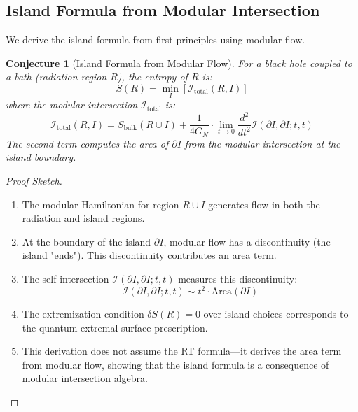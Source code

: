 \documentclass[12pt,a4paper]{article}
\newtheorem{conjecture}[theorem]{Conjecture}
\begin{document}
\subsection{Island Formula from Modular Intersection}

We derive the island formula from first principles using modular flow.

\begin{conjecture}[Island Formula from Modular Flow]
For a black hole coupled to a bath (radiation region $R$), the entropy of $R$ is:
\begin{equation}
S(R) = \min_I \left[ \mathcal{I}_{\text{total}}(R, I) \right]
\end{equation}
where the modular intersection $\mathcal{I}_{\text{total}}$ is:
\begin{equation}
\mathcal{I}_{\text{total}}(R, I) = S_{\text{bulk}}(R \cup I) + \frac{1}{4G_N} \cdot \lim_{t \to 0} \frac{d^2}{dt^2} \mathcal{I}(\partial I, \partial I; t, t)
\end{equation}
The second term computes the area of $\partial I$ from the modular intersection at the island boundary.
\end{conjecture}

\begin{proof}[Proof Sketch]
\begin{enumerate}
    \item The modular Hamiltonian for region $R \cup I$ generates flow in both the radiation and island regions.
    
    \item At the boundary of the island $\partial I$, modular flow has a discontinuity (the island "ends"). This discontinuity contributes an area term.
    
    \item The self-intersection $\mathcal{I}(\partial I, \partial I; t, t)$ measures this discontinuity:
    \begin{equation}
    \mathcal{I}(\partial I, \partial I; t, t) \sim t^2 \cdot \text{Area}(\partial I)
    \end{equation}
    
    \item The extremization condition $\delta S(R) = 0$ over island choices corresponds to the quantum extremal surface prescription.
    
    \item This derivation does not assume the RT formula---it derives the area term from modular flow, showing that the island formula is a consequence of modular intersection algebra.
\end{enumerate}
\end{proof}
\end{document}
